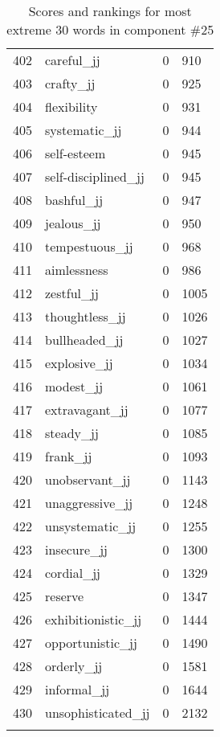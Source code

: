 \begin{longtable}[!htbp]{| rlr@{.}l |}
    402 & careful\_jj & 0 & 910 \\
    403 & crafty\_jj & 0 & 925 \\
    404 & flexibility & 0 & 931 \\
    405 & systematic\_jj & 0 & 944 \\
    406 & self-esteem & 0 & 945 \\
    407 & self-disciplined\_jj & 0 & 945 \\
    408 & bashful\_jj & 0 & 947 \\
    409 & jealous\_jj & 0 & 950 \\
    410 & tempestuous\_jj & 0 & 968 \\
    411 & aimlessness & 0 & 986 \\
    412 & zestful\_jj & 0 & 1005 \\
    413 & thoughtless\_jj & 0 & 1026 \\
    414 & bullheaded\_jj & 0 & 1027 \\
    415 & explosive\_jj & 0 & 1034 \\
    416 & modest\_jj & 0 & 1061 \\
    417 & extravagant\_jj & 0 & 1077 \\
    418 & steady\_jj & 0 & 1085 \\
    419 & frank\_jj & 0 & 1093 \\
    420 & unobservant\_jj & 0 & 1143 \\
    421 & unaggressive\_jj & 0 & 1248 \\
    422 & unsystematic\_jj & 0 & 1255 \\
    423 & insecure\_jj & 0 & 1300 \\
    424 & cordial\_jj & 0 & 1329 \\
    425 & reserve & 0 & 1347 \\
    426 & exhibitionistic\_jj & 0 & 1444 \\
    427 & opportunistic\_jj & 0 & 1490 \\
    428 & orderly\_jj & 0 & 1581 \\
    429 & informal\_jj & 0 & 1644 \\
    430 & unsophisticated\_jj & 0 & 2132 \\
    \hline
    \caption{Scores and rankings for most extreme 30 words in component \#25} \\
\end{longtable}
